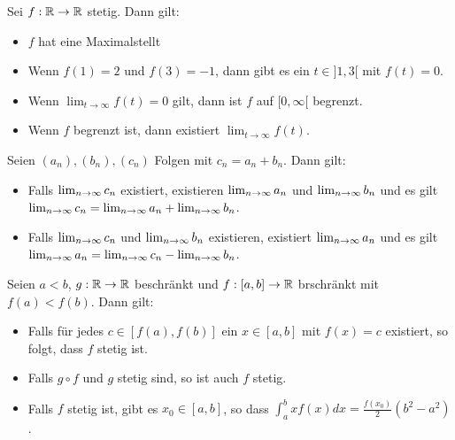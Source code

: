 Sei $f : \mathbb{R} \to \mathbb{R}$ stetig. Dann gilt:
\begin{itemize}
    \item[$\square$]
    $f$ hat eine Maximalstellt
    \item[\rlap{\raisebox{0.3ex}{\hspace{0.4ex}\tiny \ding{52}}}$\square$]
    Wenn $f(1) = 2$ und $f(3) = -1$, dann gibt es ein $t \in ]1,3[$ mit $f(t) = 0$.
    \item[\rlap{\raisebox{0.3ex}{\hspace{0.4ex}\tiny \ding{52}}}$\square$]
    Wenn $\lim_{t \to \infty} f(t) = 0$ gilt, dann ist $f$ auf $[0, \infty[$ begrenzt.
    \item[$\square$]
    Wenn $f$ begrenzt ist, dann existiert $\lim_{t \to \infty} f(t)$.
\end{itemize}

Seien $(a_n), (b_n), (c_n)$ Folgen mit $c_n = a_n + b_n$. Dann gilt:
\begin{itemize}
    \item[$\square$]
    Falls $\lim_{n \rightarrow \infty} c_n$ existiert, existieren $\lim_{n \rightarrow \infty} a_n$ und $\lim_{n \rightarrow \infty} b_n$ und es gilt
    $\lim_{n \rightarrow \infty} c_n = \lim_{n \rightarrow \infty} a_n + \lim_{n \rightarrow \infty} b_n$.
    \item[\rlap{\raisebox{0.3ex}{\hspace{0.4ex}\tiny \ding{52}}}$\square$]
    Falls $\lim_{n \rightarrow \infty} c_n$ und $\lim_{n \rightarrow \infty} b_n$ existieren, existiert $\lim_{n \rightarrow \infty} a_n$  und es gilt
    $\lim_{n \rightarrow \infty} a_n = \lim_{n \rightarrow \infty} c_n - \lim_{n \rightarrow \infty} b_n$.
\end{itemize}

Seien $a < b$, $g : \mathbb{R} \to \mathbb{R}$ beschränkt und $f : [a, b] \to \mathbb{R}$ brschränkt mit $f(a) < f(b)$. Dann gilt:
\begin{itemize}
    \item[$\square$]
    Falls für jedes $c \in [f(a), f(b)]$ ein $x \in [a,b]$ mit $f(x) = c$ existiert, so folgt, dass 
    $f$ stetig ist.
    \item[$\square$]
    Falls $g \circ f$ und $g$ stetig sind, so ist auch $f$ stetig.
    \item[\rlap{\raisebox{0.3ex}{\hspace{0.4ex}\tiny \ding{52}}}$\square$]
    Falls $f$ stetig ist, gibt es $x_0 \in [a,b]$, so dass $\int_a^b x f(x)dx = \frac{f(x_0)}{2}(b^2 - a^2)$.
\end{itemize}

